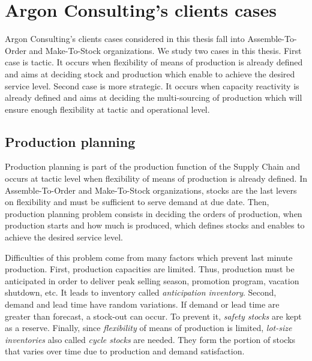 \section{Argon Consulting's clients cases}


Argon Consulting's clients cases considered in this thesis fall into Assemble-To-Order and Make-To-Stock organizations.
We study two cases in this thesis.
First case is tactic.
It occurs when flexibility of means of production is already defined and aims at deciding stock and production which enable to achieve the desired service level.
Second case is more strategic.
It occurs when capacity reactivity is already defined and aims at deciding the multi-sourcing of production which will ensure enough flexibility at tactic and operational level.


\subsection{Production planning}
\label{sec:business-context:argon:pdp}


Production planning is part of the production function of the Supply Chain and occurs at tactic level when flexibility of means of production is already defined.
In Assemble-To-Order and Make-To-Stock organizations, stocks are the last levers on flexibility and must be sufficient to serve demand at due date.
Then, production planning problem consists in deciding the orders of production, \ie when production starts and how much is produced, which defines stocks and enables to achieve the desired service level.


Difficulties of this problem come from many factors which prevent last minute production.
First, production capacities are limited.
Thus, production must be anticipated in order to deliver peak selling season, promotion program, vacation shutdown, etc.
It leads to inventory called \emph{anticipation inventory}.
Second, demand and lead time have random variations.
If demand or lead time are greater than forecast, a stock-out can occur.
To prevent it, \emph{safety stocks} are kept as a reserve.
Finally, since \emph{flexibility} of means of production is limited, \emph{lot-size inventories} also called \emph{cycle stocks} are needed.
They form the portion of stocks that varies over time due to production and demand satisfaction.


